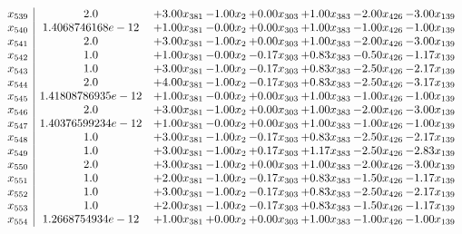 \documentclass[8pt]{article}
\begin{document}
\[\begin{array}{c| c c@{\hskip 2pt} c@{\hskip 2pt} c@{\hskip 2pt} c@{\hskip 2pt} c@{\hskip 2pt} c@{\hskip 2pt} }
 x_{539}   &  2.0 & +  3.00 x_{381} & -1.00 x_{2} & +  0.00 x_{303} & +  1.00 x_{383} & -2.00 x_{426} & -3.00 x_{139}\\
 x_{540}   &  1.4068746168e-12 & +  1.00 x_{381} & -0.00 x_{2} & +  0.00 x_{303} & +  1.00 x_{383} & -1.00 x_{426} & -1.00 x_{139}\\
 x_{541}   &  2.0 & +  3.00 x_{381} & -1.00 x_{2} & +  0.00 x_{303} & +  1.00 x_{383} & -2.00 x_{426} & -3.00 x_{139}\\
 x_{542}   &  1.0 & +  1.00 x_{381} & -0.00 x_{2} & -0.17 x_{303} & +  0.83 x_{383} & -0.50 x_{426} & -1.17 x_{139}\\
 x_{543}   &  1.0 & +  3.00 x_{381} & -1.00 x_{2} & -0.17 x_{303} & +  0.83 x_{383} & -2.50 x_{426} & -2.17 x_{139}\\
 x_{544}   &  2.0 & +  4.00 x_{381} & -1.00 x_{2} & -0.17 x_{303} & +  0.83 x_{383} & -2.50 x_{426} & -3.17 x_{139}\\
 x_{545}   &  1.41808786935e-12 & +  1.00 x_{381} & -0.00 x_{2} & +  0.00 x_{303} & +  1.00 x_{383} & -1.00 x_{426} & -1.00 x_{139}\\
 x_{546}   &  2.0 & +  3.00 x_{381} & -1.00 x_{2} & +  0.00 x_{303} & +  1.00 x_{383} & -2.00 x_{426} & -3.00 x_{139}\\
 x_{547}   &  1.40376599234e-12 & +  1.00 x_{381} & -0.00 x_{2} & +  0.00 x_{303} & +  1.00 x_{383} & -1.00 x_{426} & -1.00 x_{139}\\
 x_{548}   &  1.0 & +  3.00 x_{381} & -1.00 x_{2} & -0.17 x_{303} & +  0.83 x_{383} & -2.50 x_{426} & -2.17 x_{139}\\
 x_{549}   &  1.0 & +  3.00 x_{381} & -1.00 x_{2} & +  0.17 x_{303} & +  1.17 x_{383} & -2.50 x_{426} & -2.83 x_{139}\\
 x_{550}   &  2.0 & +  3.00 x_{381} & -1.00 x_{2} & +  0.00 x_{303} & +  1.00 x_{383} & -2.00 x_{426} & -3.00 x_{139}\\
 x_{551}   &  1.0 & +  2.00 x_{381} & -1.00 x_{2} & -0.17 x_{303} & +  0.83 x_{383} & -1.50 x_{426} & -1.17 x_{139}\\
 x_{552}   &  1.0 & +  3.00 x_{381} & -1.00 x_{2} & -0.17 x_{303} & +  0.83 x_{383} & -2.50 x_{426} & -2.17 x_{139}\\
 x_{553}   &  1.0 & +  2.00 x_{381} & -1.00 x_{2} & -0.17 x_{303} & +  0.83 x_{383} & -1.50 x_{426} & -1.17 x_{139}\\
 x_{554}   &  1.2668754934e-12 & +  1.00 x_{381} & +  0.00 x_{2} & +  0.00 x_{303} & +  1.00 x_{383} & -1.00 x_{426} & -1.00 x_{139}\\

\end{array}\]
\end{document}
